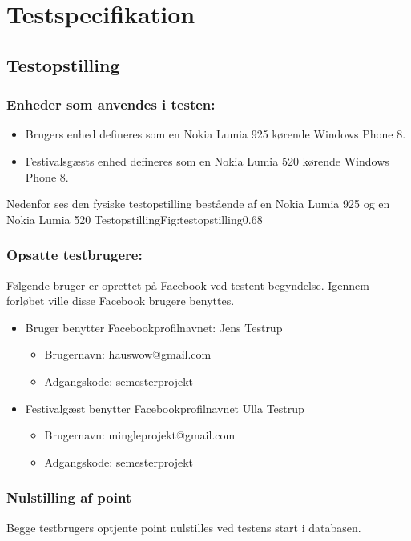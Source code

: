 \chapter{Testspecifikation}
 \label{chp:testspecifikation}
 

\section{Testopstilling}

\subsection{Enheder som anvendes i testen:}

\begin{itemize}
\item Brugers enhed defineres som en Nokia Lumia 925 kørende Windows Phone 8.
\item Festivalsgæsts enhed defineres som en Nokia Lumia 520 kørende Windows Phone 8.
\end{itemize}


Nedenfor ses den fysiske testopstilling bestående af en Nokia Lumia 925 og en Nokia Lumia 520
 {Testopstilling}{Fig:testopstilling}{0.68} 


\subsection{Opsatte testbrugere:}
Følgende bruger er oprettet på Facebook ved testent begyndelse. Igennem forløbet ville disse Facebook brugere benyttes.
\begin{itemize}
\item Bruger benytter Facebookprofilnavnet: Jens Testrup
\begin{itemize}
\item Brugernavn: hauswow@gmail.com
\item Adgangskode: semesterprojekt
\end{itemize}
\item Festivalgæst benytter Facebookprofilnavnet Ulla Testrup
\begin{itemize}
\item Brugernavn: mingleprojekt@gmail.com
\item Adgangskode: semesterprojekt
\end{itemize}
\end{itemize}

\subsection{Nulstilling af point}
Begge testbrugers optjente point nulstilles ved testens start i databasen.


